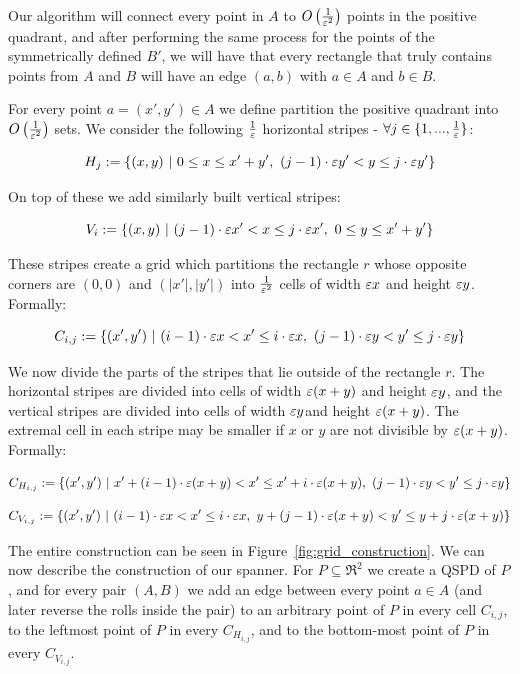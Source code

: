 \documentclass[12pt]{article}%
\begin{document}
Our algorithm will connect every point in $A$ to $O\left(\frac{1}{\varepsilon^2}\right)$ points in the positive quadrant, and after performing the same process for the points of the symmetrically defined $B'$, we will have that every rectangle that truly contains points from $A$ and $B$ will have an edge $(a,b)$ with $a\in A$ and $b\in B$.

For every point $a = (x',y') \in A$ we define partition the positive quadrant into $O\left(\frac{1}{\varepsilon^2}\right)$ sets. We consider the following $\frac{1}{\varepsilon}$ horizontal stripes - $\forall j\in \{1,...,\frac{1}{\varepsilon}\}$:

$$H_{j}:=\{(x,y)~|~  0 \leq x \leq x'+y'  ,~ (j-1)\cdot \varepsilon y' < y \leq j\cdot \varepsilon y'\}$$

On top of these we add similarly built vertical stripes:

$$V_{i}:=\{(x,y)~|~ (j-1)\cdot \varepsilon x' < x \leq j\cdot \varepsilon x',~ 0 \leq y \leq x'+y' \}$$

These stripes create a grid which partitions the rectangle $r$ whose opposite corners are $(0,0)$ and $(|x'|,|y'|)$ into $\frac{1}{\varepsilon^2}$ cells of width $\varepsilon x$ and height $\varepsilon y$. Formally:

$$C_{i,j}:=\{(x',y')~|~  (i-1)\cdot \varepsilon x < x' \leq i\cdot \varepsilon x,~ (j-1)\cdot \varepsilon y< y' \leq j\cdot \varepsilon y\}$$

We now divide the parts of the stripes that lie outside of the rectangle $r$. The horizontal stripes are divided into cells of width $\varepsilon(x+y)$ and height $\varepsilon y$, and the vertical stripes are divided into cells of width $\varepsilon y$and height $\varepsilon(x+y)$. The extremal cell in each stripe may be smaller if $x$ or $y$ are not divisible by $\varepsilon(x+y)$. Formally:

$$C_{H_{i,j}}:=\{(x',y')~|~  x' + (i-1)\cdot \varepsilon (x+y) < x' \leq x' + i\cdot \varepsilon (x+y),~ (j-1)\cdot \varepsilon y< y' \leq j\cdot \varepsilon y\}$$

$$C_{V_{i,j}}:=\{(x',y')~|~  (i-1)\cdot \varepsilon x < x' \leq i\cdot \varepsilon x,~ y + (j-1)\cdot \varepsilon (x+y)< y' \leq y + j\cdot \varepsilon (x+y)\}$$

The entire construction can be seen in Figure~\ref{fig:grid_construction}. We can now describe the construction of our spanner. For $P\subseteq \Re^2$ we create a QSPD of $P$, and for every pair $(A,B)$ we add an edge between every point $a\in A$ (and later reverse the rolls inside the pair) to an arbitrary point of $P$ in every cell $C_{i,j}$, to the leftmost point of $P$ in every $C_{H_{i,j}}$, and to the bottom-most point of $P$ in every $C_{V_{i,j}}$.
\end{document}
